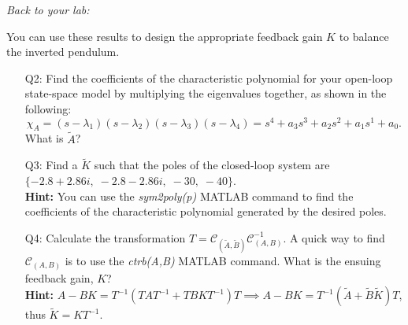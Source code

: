 \noindent \emph{Back to your lab:}

You can use these results to design the appropriate feedback gain $K$ to balance the inverted pendulum.
\begin{enumerate}
    \item[Q2:] Find the coefficients of the characteristic polynomial for your open-loop state-space model by multiplying the eigenvalues together, as shown in the following:
          \[
              \chi_{A} = (s-\lambda_1)(s-\lambda_2)(s-\lambda_3)(s-\lambda_4) = s^4 + a_3 s^3 + a_2 s^2 + a_1 s^1 + a_0.
          \]
          What is $\tilde{A}$?\\
    \item[Q3:] Find a $\tilde{K}$ such that the poles of the closed-loop system are $\{-2.8 + 2.86i, \; -2.8 - 2.86i, \; -30, \; -40\}$.\\
          \textbf{Hint:} You can use the \emph{sym2poly(p)} MATLAB command to find the coefficients of the characteristic polynomial generated by the desired poles.\\
    \item[Q4:] Calculate the transformation $T=\mathcal{C}_{(\tilde{A},\tilde{B})} \mathcal{C}_{(A,B)}^{-1}$. A quick way to find $\mathcal{C}_{(A,B)}$ is to use the \emph{ctrb(A,B)} MATLAB command. What is the ensuing feedback gain, $K$?\\
          \textbf{Hint:} $A-BK= T^{-1}(TAT^{-1} + TBKT^{-1})T \implies A-BK = T^{-1}(\tilde{A}+\tilde{B}\tilde{K})T$, thus $\tilde{K}=KT^{-1}$.\\
\end{enumerate}
